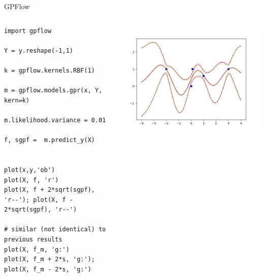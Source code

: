 \documentclass[presentation]{beamer}
\begin{document}
\begin{frame}[fragile,label={sec:org5ac90d9}]{GPFlow}
 \begin{columns}
\begin{column}{0.43\columnwidth}
\begin{verbatim}
import gpflow

Y = y.reshape(-1,1)

k = gpflow.kernels.RBF(1)

m = gpflow.models.gpr(x, Y, kern=k)

m.likelihood.variance = 0.01

f, sgpf =  m.predict_y(X)


plot(x,y,'ob')
plot(X, f, 'r')
plot(X, f + 2*sqrt(sgpf), 'r--'); plot(X, f - 2*sqrt(sgpf), 'r--')

# similar (not identical) to previous results
plot(X, f_m, 'g:')
plot(X, f_m + 2*s, 'g:'); plot(X, f_m - 2*s, 'g:')
\end{verbatim}
\end{column}



\begin{column}{0.5\columnwidth}
\begin{center}
\includegraphics[width=.9\linewidth]{images/fig06.png}
\end{center}
\end{column}
\end{columns}
\end{frame}
\end{document}
